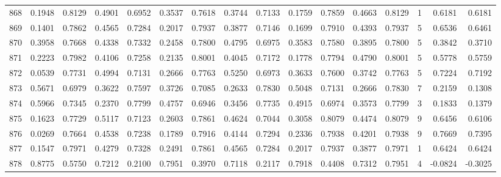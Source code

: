 \begin{tabular}{lrrrrrrrrrrrrrrr}
868 &      0.1948 &  0.8129 &  0.4901 &  0.6952 &  0.3537 &  0.7618 &  0.3744 &  0.7133 &  0.1759 &  0.7859 &   0.4663 &     0.8129 &      1 &                    0.6181 &                     0.6181 \\
869 &      0.1401 &  0.7862 &  0.4565 &  0.7284 &  0.2017 &  0.7937 &  0.3877 &  0.7146 &  0.1699 &  0.7910 &   0.4393 &     0.7937 &      5 &                    0.6536 &                     0.6461 \\
870 &      0.3958 &  0.7668 &  0.4338 &  0.7332 &  0.2458 &  0.7800 &  0.4795 &  0.6975 &  0.3583 &  0.7580 &   0.3895 &     0.7800 &      5 &                    0.3842 &                     0.3710 \\
871 &      0.2223 &  0.7982 &  0.4106 &  0.7258 &  0.2135 &  0.8001 &  0.4045 &  0.7172 &  0.1778 &  0.7794 &   0.4790 &     0.8001 &      5 &                    0.5778 &                     0.5759 \\
872 &      0.0539 &  0.7731 &  0.4994 &  0.7131 &  0.2666 &  0.7763 &  0.5250 &  0.6973 &  0.3633 &  0.7600 &   0.3742 &     0.7763 &      5 &                    0.7224 &                     0.7192 \\
873 &      0.5671 &  0.6979 &  0.3622 &  0.7597 &  0.3726 &  0.7085 &  0.2633 &  0.7830 &  0.5048 &  0.7131 &   0.2666 &     0.7830 &      7 &                    0.2159 &                     0.1308 \\
874 &      0.5966 &  0.7345 &  0.2370 &  0.7799 &  0.4757 &  0.6946 &  0.3456 &  0.7735 &  0.4915 &  0.6974 &   0.3573 &     0.7799 &      3 &                    0.1833 &                     0.1379 \\
875 &      0.1623 &  0.7729 &  0.5117 &  0.7123 &  0.2603 &  0.7861 &  0.4624 &  0.7044 &  0.3058 &  0.8079 &   0.4474 &     0.8079 &      9 &                    0.6456 &                     0.6106 \\
876 &      0.0269 &  0.7664 &  0.4538 &  0.7238 &  0.1789 &  0.7916 &  0.4144 &  0.7294 &  0.2336 &  0.7938 &   0.4201 &     0.7938 &      9 &                    0.7669 &                     0.7395 \\
877 &      0.1547 &  0.7971 &  0.4279 &  0.7328 &  0.2491 &  0.7861 &  0.4565 &  0.7284 &  0.2017 &  0.7937 &   0.3877 &     0.7971 &      1 &                    0.6424 &                     0.6424 \\
878 &      0.8775 &  0.5750 &  0.7212 &  0.2100 &  0.7951 &  0.3970 &  0.7118 &  0.2117 &  0.7918 &  0.4408 &   0.7312 &     0.7951 &      4 &                   -0.0824 &                    -0.3025 \\

\end{tabular}
